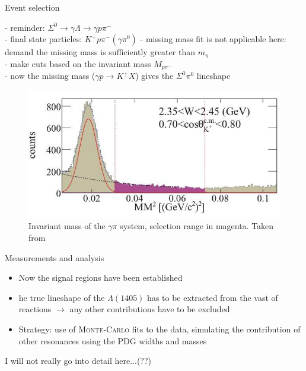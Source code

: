 \documentclass[11pt,aspectratio=1610,dvipsnames]{beamer}
\begin{document}
\begin{frame}{Event selection}
	\begin{minipage}{\linewidth}
		\begin{tcolorbox}[colback=black!10,colframe=gray!20!black,title=extracting $\Sigma^0\pi^0$] 
			- reminder: $\Sigma^0\to\gamma\Lambda\to\gamma p \pi^-$\\
			- final state particles: $K^+ p \pi^-(\gamma\pi^0)$
			- missing mass fit is not applicable here: \phantom{- }demand the missing mass is sufficiently greater than $m_\pi$\\
			- make cuts based on the invariant mass $M_{p\pi^-}$\\
			- now the missing mass ($\gamma p\to K^+ X$) gives the $\Sigma^0\pi^0$ lineshape
		\end{tcolorbox}	
	\end{minipage}
\begin{figure}
	\centering
	\includegraphics[width=.5\linewidth]{mism.jpg}
	\caption{Invariant mass of the $\gamma\pi$ system, selection range in magenta. Taken from \citet{lineshapes}}
\end{figure}
\end{frame}




\begin{frame}{Measurements and analysis}
	\begin{itemize}
		\item Now the signal regions have been established
		\item he true lineshape of the $\Lambda(1405)$ has to be extracted from the vast of reactions $\to$ any other contributions have to be excluded
		\item Strategy: use of \textsc{Monte-Carlo} fits to the data, simulating the contribution of other resonances using the PDG widths and masses
		
	\end{itemize}
\color{red} I will not really go into detail here...(??)
\end{frame}
\end{document}
